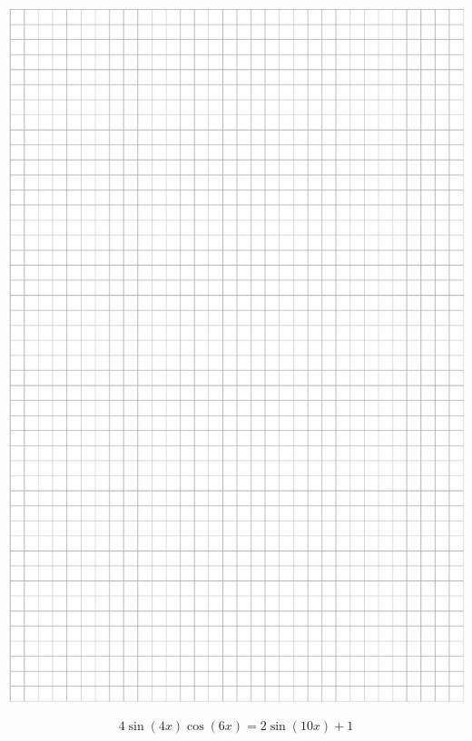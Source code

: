 \documentclass[10pt]{article}
\begin{document}
\begin{center}
\includegraphics[max width=\textwidth]{2024_11_21_f1ecc00f5c4ab21f0d04g-09}
\end{center}

\[
4 \sin (4 x) \cos (6 x)=2 \sin (10 x)+1
\]
\end{document}
